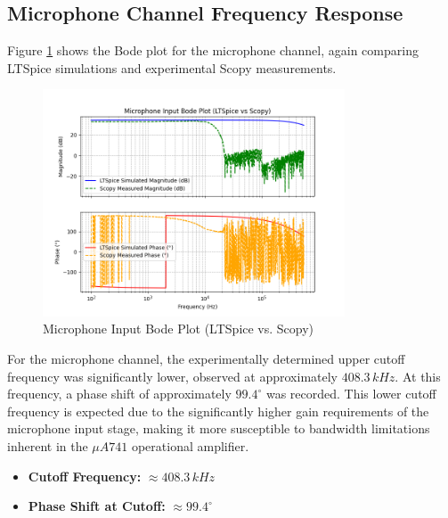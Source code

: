 \documentclass[12pt]{article}
\begin{document}
\subsection{Microphone Channel Frequency Response}

Figure \ref{fig:mic_bode} shows the Bode plot for the microphone channel, again comparing LTSpice simulations and experimental Scopy measurements.

\begin{figure}[H]
	\centering
	\includegraphics[width=0.8\textwidth]{dp_mic}
	\caption{Microphone Input Bode Plot (LTSpice vs. Scopy)}
	\label{fig:mic_bode}
\end{figure}

For the microphone channel, the experimentally determined upper cutoff frequency was significantly lower, observed at approximately $408.3\,kHz$. At this frequency, a phase shift of approximately $99.4^\circ$ was recorded. This lower cutoff frequency is expected due to the significantly higher gain requirements of the microphone input stage, making it more susceptible to bandwidth limitations inherent in the $\mu A741$ operational amplifier.

\begin{itemize}
	\item \textbf{Cutoff Frequency:} $\approx 408.3\,kHz$
	\item \textbf{Phase Shift at Cutoff:} $\approx 99.4^\circ$
\end{itemize}
\end{document}
